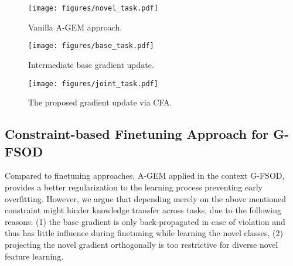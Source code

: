 \documentclass[10pt,twocolumn,letterpaper]{article}
\begin{document}
\begin{figure*}
 \centering
 \begin{subfigure}{0.3\linewidth}
    \texttt{[image: figures/novel\_task.pdf]}
    \caption{Vanilla A-GEM approach.}
    \label{fig:agem}
 \end{subfigure}
 \begin{subfigure}{0.3\linewidth}
    \texttt{[image: figures/base\_task.pdf]}
    \caption{Intermediate base gradient update.}
    \label{fig:intermediate}
 \end{subfigure}
 \begin{subfigure}{0.3\linewidth}
    \texttt{[image: figures/joint\_task.pdf]}
    \caption{The proposed gradient update via CFA.}
    \label{fig:cfa}
 \end{subfigure}
  \caption{Visualization of the gradient update for vanilla A-GEM and the proposed CFA. In \cref{fig:agem}, we present the novel task gradient update using the A-GEM where the novel task gradient is projected orthogonally to base task gradient. \cref{fig:intermediate} shows the the solution for the proposed constraint where the base task gradient is projected to a right angle with the novel task gradient. Finally, the final gradient update for the CFA algorithm is shown in \cref{fig:cfa}.}\vspace{-1em}
  \label{fig:gradients_vis}\end{figure*} 
\subsection{Constraint-based Finetuning Approach for G-FSOD}
\label{subsec:cfa}
Compared to finetuning approaches, A-GEM applied in the context G-FSOD, provides a better regularization to the learning process preventing early overfitting. However, we argue that depending merely on the above mentioned constraint might hinder knowledge transfer across tasks, due to the following reasons: (1) the base gradient is only back-propagated in case of violation and thus has little influence during finetuning while learning the novel classes, (2) projecting the novel gradient orthogonally is too restrictive for diverse novel feature learning.
 
\end{document}
